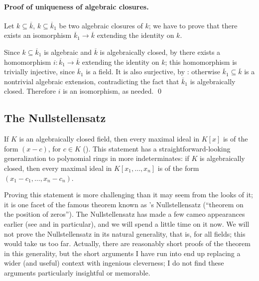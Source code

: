 \paragraph{Proof of uniqueness of algebraic closures.}
Let $k \subseteq \overline{k}$, $k \subseteq \overline{k}_1$ be two
algebraic closures of $k$; we have to prove that there exists an
isomorphism $\overline{k}_1 \to \overline{k}$ extending the identity
on $k$.

Since $k \subseteq \overline{k}_1$ is algebraic and $\overline{k}$ is
algebraically closed, by  there exists a
homomorphism $i : \overline{k}_1 \to \overline{k}$ extending the
identity on $k$; this homomorphism is trivially injective, since
$\overline{k}_1$ is a field. It is also surjective, by
: otherwise
$\overline{k}_1 \subseteq \overline{k}$ is a nontrivial algebraic
extension, contradicting the fact that $\overline{k}_1$ is
algebraically closed. Therefore $i$ is an isomorphism, as
needed. \qed{}

\subsection{The Nullstellensatz}%
\label{subsec:fields:the-nullstellensatz}
If $K$ is an algebraically closed field, then every maximal ideal in
$K[x]$ is of the form $(x - c)$, for $c \in K$
().  This statement has a
straightforward-looking generalization to polynomial rings in more
indeterminates: if $K$ is algebraically closed, then every maximal
ideal in $K[x_1, \dots, x_n]$ is of the form
$(x_1 - c_1, \dots, x_n - c_n)$.

Proving this statement is more challenging than it may seem from the
looks of it; it is one facet of the famous theorem known as
's Nullstellensatz (``theorem on the position of
zeros''). The Nullstellensatz has made a few cameo appearances earlier
(see  and
 in
particular), and we will spend a little time on it now.  We will not
prove the Nullstellensatz in its natural generality, that is, for all
fields; this would take us too far. Actually, there are reasonably
short proofs of the theorem in this generality, but the short
arguments I have run into end up replacing a wider (and useful)
context with ingenious cleverness; I do not find these arguments
particularly insightful or memorable.

